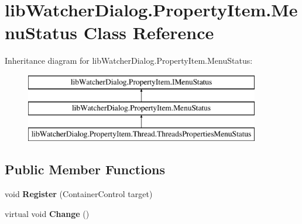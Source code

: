 \hypertarget{classlib_watcher_dialog_1_1_property_item_1_1_menu_status}{\section{lib\+Watcher\+Dialog.\+Property\+Item.\+Menu\+Status Class Reference}
\label{classlib_watcher_dialog_1_1_property_item_1_1_menu_status}
}
Inheritance diagram for lib\+Watcher\+Dialog.\+Property\+Item.\+Menu\+Status\+:\begin{figure}[H]
\begin{center}
\leavevmode
\includegraphics[height=3.000000cm]{classlib_watcher_dialog_1_1_property_item_1_1_menu_status}
\end{center}
\end{figure}
\subsection*{Public Member Functions}
\begin{DoxyCompactItemize}
\item 
\hypertarget{classlib_watcher_dialog_1_1_property_item_1_1_menu_status_afa9868bab68b4b5f1d0727d6b87d9e25}{void {\bfseries Register} (Container\+Control target)}\label{classlib_watcher_dialog_1_1_property_item_1_1_menu_status_afa9868bab68b4b5f1d0727d6b87d9e25}

\item 
\hypertarget{classlib_watcher_dialog_1_1_property_item_1_1_menu_status_abab514025a7e2d1e3e3672610c11b9fd}{virtual void {\bfseries Change} ()}\label{classlib_watcher_dialog_1_1_property_item_1_1_menu_status_abab514025a7e2d1e3e3672610c11b9fd}

\end{DoxyCompactItemize}
